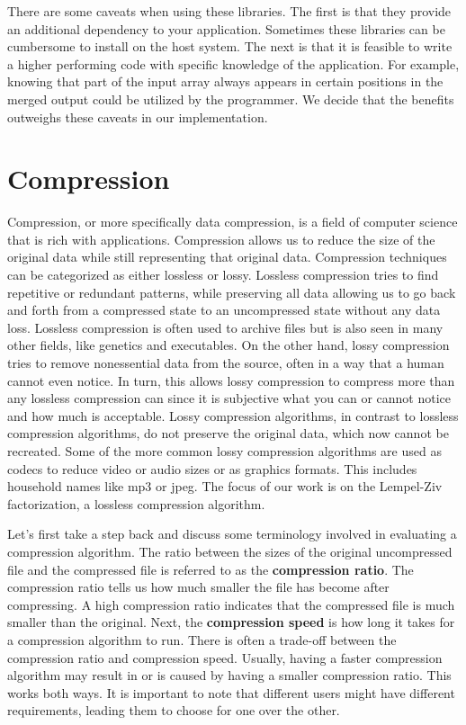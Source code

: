 There are some caveats when using these libraries.
The first is that they provide an additional dependency to your application.
Sometimes these libraries can be cumbersome to install on the host system.
The next is that it is feasible to write a higher performing code with specific knowledge of the application.
For example, knowing that part of the input array always appears in certain positions in the merged output could be utilized by the programmer.
We decide that the benefits outweighs these caveats in our implementation.

\section{Compression}

Compression, or more specifically data compression, is a field of computer science that is rich with applications.
Compression allows us to reduce the size of the original data while still representing that original data.
Compression techniques can be categorized as either lossless or lossy.
Lossless compression tries to find repetitive or redundant patterns, while preserving all data allowing us to go back and forth from a compressed state to an uncompressed state without any data loss. 
Lossless compression is often used to archive files but is also seen in many other fields, like genetics and executables.
On the other hand, lossy compression tries to remove nonessential data from the source, often in a way that a human cannot even notice.
In turn, this allows lossy compression to compress more than any lossless compression can since it is subjective what you can or cannot notice and how much is acceptable.
Lossy compression algorithms, in contrast to lossless compression algorithms, do not preserve the original data, which now cannot be recreated.
Some of the more common lossy compression algorithms are used as codecs to reduce video or audio sizes or as graphics formats.
This includes household names like mp3 or jpeg.
The focus of our work is on the Lempel-Ziv factorization, a lossless compression algorithm.

Let's first take a step back and discuss some terminology involved in evaluating a compression algorithm.
The ratio between the sizes of the original uncompressed file and the compressed file is referred to as the \textbf{compression ratio}.
The compression ratio tells us how much smaller the file has become after compressing.
A high compression ratio indicates that the compressed file is much smaller than the original.
Next, the \textbf{compression speed} is how long it takes for a compression algorithm to run.
There is often a trade-off between the compression ratio and compression speed.
Usually, having a faster compression algorithm may result in or is caused by having a smaller compression ratio.
This works both ways.
It is important to note that different users might have different requirements, leading them to choose for one over the other.

